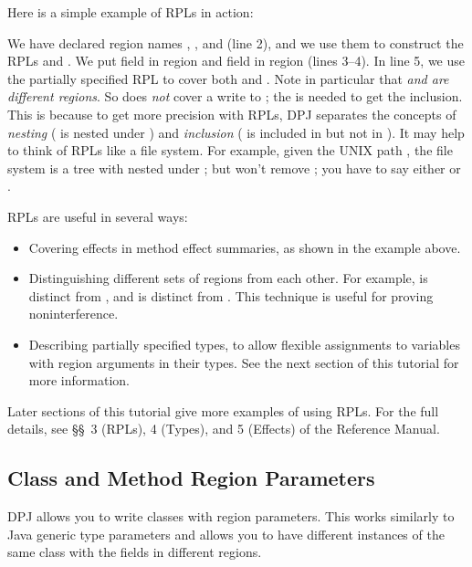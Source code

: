 Here is a simple example of RPLs in action:
%

%
We have declared region names , , and  (line 2),
and we use them to construct the RPLs  and .  We put
field  in region  and field  in region
 (lines 3--4).  In line 5, we use the partially specified RPL
 to cover both  and .  Note in particular
that \emph{ and  are different regions}.  So
 does \emph{not} cover a write to ; the \kwd{*}
is needed to get the inclusion.  This is because to get more precision
with RPLs, DPJ separates the concepts of \emph{nesting} ( is
nested under ) and \emph{inclusion} ( is included in
 but not in ).  It may help to think of RPLs like a
file system.  For example, given the UNIX path , the file
system is a tree with  nested under ; but  won't remove ; you have to say either 
or .

RPLs are useful in several ways:
%
\begin{itemize}
%
\item Covering effects in method effect summaries, as shown in the
  example above.
%
\item Distinguishing different sets of regions from each other.  For
  example,  is distinct from , and  is
  distinct from .  This technique is useful for proving
  noninterference.
%
\item Describing partially specified types, to allow flexible
  assignments to variables with region arguments in their types.  See
  the next section of this tutorial for more information.
%
\end{itemize}
%
Later sections of this tutorial give more examples of using RPLs.  For
the full details, see \S\S~3 (RPLs), 4 (Types), and 5 (Effects) of the
Reference Manual.

\subsection{Class and Method Region Parameters%
\label{sec:overview:params}}

 DPJ allows you to write classes with
region parameters.  This works similarly to Java generic type
parameters and allows you to have different instances of the same
class with the fields in different regions.

